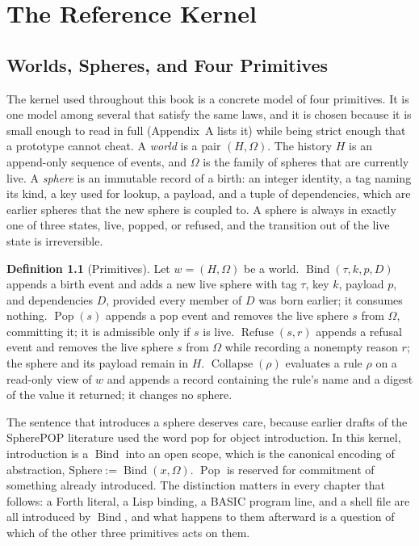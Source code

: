 \documentclass[11pt,oneside]{report}
\newcommand{\SP}{SpherePOP}
\newcommand{\Pop}{\operatorname{Pop}}
\newcommand{\Refuse}{\operatorname{Refuse}}
\newcommand{\Bind}{\operatorname{Bind}}
\newcommand{\Collapse}{\operatorname{Collapse}}
\theoremstyle{plain}
\theoremstyle{definition}
\newtheorem{definition}[proposition]{Definition}
\theoremstyle{remark}
\begin{document}
\chapter{The Reference Kernel}

\section{Worlds, Spheres, and Four Primitives}

The kernel used throughout this book is a concrete model of four primitives. It is one model among several that satisfy the same laws, and it is chosen because it is small enough to read in full (Appendix~A lists it) while being strict enough that a prototype cannot cheat. A \emph{world} is a pair $(H,\Omega)$. The history $H$ is an append-only sequence of events, and $\Omega$ is the family of spheres that are currently live. A \emph{sphere} is an immutable record of a birth: an integer identity, a tag naming its kind, a key used for lookup, a payload, and a tuple of dependencies, which are earlier spheres that the new sphere is coupled to. A sphere is always in exactly one of three states, live, popped, or refused, and the transition out of the live state is irreversible.

\begin{definition}[Primitives]
Let $w=(H,\Omega)$ be a world. $\Bind(\tau,k,p,D)$ appends a birth event and adds a new live sphere with tag $\tau$, key $k$, payload $p$, and dependencies $D$, provided every member of $D$ was born earlier; it consumes nothing. $\Pop(s)$ appends a pop event and removes the live sphere $s$ from $\Omega$, committing it; it is admissible only if $s$ is live. $\Refuse(s,r)$ appends a refusal event and removes the live sphere $s$ from $\Omega$ while recording a nonempty reason $r$; the sphere and its payload remain in $H$. $\Collapse(\rho)$ evaluates a rule $\rho$ on a read-only view of $w$ and appends a record containing the rule's name and a digest of the value it returned; it changes no sphere.
\end{definition}

The sentence that introduces a sphere deserves care, because earlier drafts of the \SP{} literature used the word pop for object introduction. In this kernel, introduction is a $\Bind$ into an open scope, which is the canonical encoding of abstraction, $\mathrm{Sphere}:=\Bind(x,\Omega)$. $\Pop$ is reserved for commitment of something already introduced. The distinction matters in every chapter that follows: a Forth literal, a Lisp binding, a BASIC program line, and a shell file are all introduced by $\Bind$, and what happens to them afterward is a question of which of the other three primitives acts on them.
\end{document}
